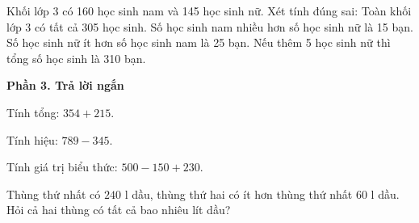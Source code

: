 \begin{ex} %
Khối lớp 3 có 160 học sinh nam và 145 học sinh nữ. Xét tính đúng sai:
\choiceTF
{\True Toàn khối lớp 3 có tất cả 305 học sinh.}
{\True Số học sinh nam nhiều hơn số học sinh nữ là 15 bạn.}
{Số học sinh nữ ít hơn số học sinh nam là 25 bạn.}
{\True Nếu thêm 5 học sinh nữ thì tổng số học sinh là 310 bạn.}
\end{ex}

\textbf{Phần 3. Trả lời ngắn}

\begin{ex} %
Tính tổng: $354 + 215$.
\end{ex}

\begin{ex} %
Tính hiệu: $789 - 345$.
\end{ex}

\begin{ex} %
Tính giá trị biểu thức: $500 - 150 + 230$.
\end{ex}

\begin{ex} %
Thùng thứ nhất có $240\text{ l}$ dầu, thùng thứ hai có ít hơn thùng thứ nhất $60\text{ l}$ dầu. Hỏi cả hai thùng có tất cả bao nhiêu lít dầu?
\end{ex}

